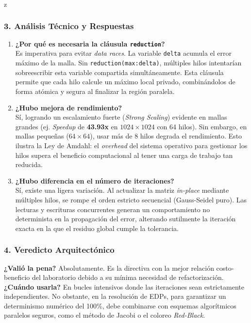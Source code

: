 z\documentclass[11pt,a4paper]{article}
\begin{document}
\subsubsection*{3. Análisis Técnico y Respuestas}

\begin{enumerate}
    \item \textbf{¿Por qué es necesaria la cláusula \texttt{reduction}?} \\
    Es imperativa para evitar \textit{data races}. La variable \texttt{delta} acumula el error máximo de la malla. Sin \texttt{reduction(max:delta)}, múltiples hilos intentarían sobreescribir esta variable compartida simultáneamente. Esta cláusula permite que cada hilo calcule un máximo local privado, combinándolos de forma atómica y segura al finalizar la región paralela.

    \item \textbf{¿Hubo mejora de rendimiento?} \\
    Sí, logrando un escalamiento fuerte (\textit{Strong Scaling}) evidente en mallas grandes (ej. \textit{Speedup} de \textbf{43.93x} en $1024 \times 1024$ con 64 hilos). Sin embargo, en mallas pequeñas ($64 \times 64$), usar más de 8 hilos degrada el rendimiento. Esto ilustra la Ley de Amdahl: el \textit{overhead} del sistema operativo para gestionar los hilos supera el beneficio computacional al tener una carga de trabajo tan reducida.

    \item \textbf{¿Hubo diferencia en el número de iteraciones?} \\
    Sí, existe una ligera variación. Al actualizar la matriz \textit{in-place} mediante múltiples hilos, se rompe el orden estricto secuencial (Gauss-Seidel puro). Las lecturas y escrituras concurrentes generan un comportamiento no determinista en la propagación del error, alterando sutilmente la iteración exacta en la que el residuo global cumple la tolerancia.
\end{enumerate}

\subsubsection*{4. Veredicto Arquitectónico}
\textbf{¿Valió la pena?} Absolutamente. Es la directiva con la mejor relación costo-beneficio del laboratorio debido a su mínima necesidad de refactorización. \textbf{¿Cuándo usarla?} En bucles intensivos donde las iteraciones sean estrictamente independientes. No obstante, en la resolución de EDPs, para garantizar un determinismo numérico del 100\%, debe combinarse con esquemas algorítmicos paralelos seguros, como el método de Jacobi o el coloreo \textit{Red-Black}.
\end{document}
